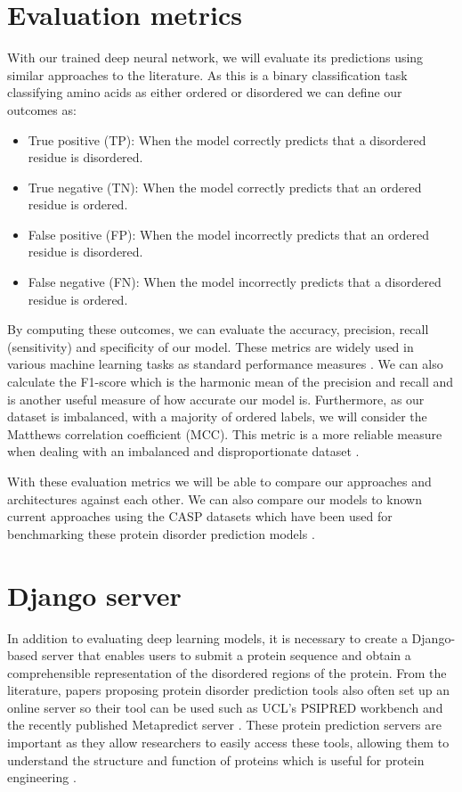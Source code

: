 \documentclass{l4proj}
\begin{document}
\section{Evaluation metrics}
\label{chap:analysis sec:evaluation}
With our trained deep neural network, we will evaluate its predictions using similar approaches to the literature. As this is a binary classification task classifying amino acids as either ordered or disordered we can define our outcomes as: 

\begin{itemize}    
    \item True positive (TP): When the model correctly predicts that a disordered residue is disordered.
    \item True negative (TN): When the model correctly predicts that an ordered residue is ordered.
    \item False positive (FP): When the model incorrectly predicts that an ordered residue is disordered.
    \item False negative (FN): When the model incorrectly predicts that a disordered residue is ordered. \citep{google_TP}
\end{itemize}

By computing these outcomes, we can evaluate the accuracy, precision, recall (sensitivity) and specificity of our model. These metrics are widely used in various machine learning tasks as standard performance measures \citep{BC:wiki}. We can also calculate the F1-score which is the harmonic mean of the precision and recall and is another useful measure of how accurate our model is. Furthermore, as our dataset is imbalanced, with a majority of ordered labels, we will consider the Matthews correlation coefficient (MCC). This metric is a more reliable measure when dealing with an imbalanced and disproportionate dataset \citep{Chicco:20}.

With these evaluation metrics we will be able to compare our approaches and architectures against each other. We can also compare our models to known current approaches using the CASP datasets which have been used for benchmarking these protein disorder prediction models \citep{casp}.

\section{Django server}

In addition to evaluating deep learning models, it is necessary to create a Django-based server that enables users to submit a protein sequence and obtain a comprehensible representation of the disordered regions of the protein. From the literature, papers proposing protein disorder prediction tools also often set up an online server so their tool can be used such as UCL's PSIPRED workbench \citep{Jones:19} and the recently published Metapredict server \citep{Emenecker:21}. These protein prediction servers are important as they allow researchers to easily access these tools, allowing them to understand the structure and function of proteins which is useful for protein engineering \citep{protengineering:wiki}. 
\end{document}
